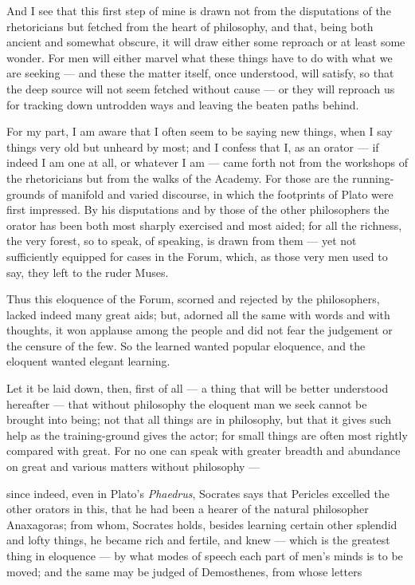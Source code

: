  And I see that this first step of mine is drawn not from the disputations of the rhetoricians but fetched from the heart of philosophy, and that, being both ancient and somewhat obscure, it will draw either some reproach or at least some wonder. For men will either marvel what these things have to do with what we are seeking — and these the matter itself, once understood, will satisfy, so that the deep source will not seem fetched without cause — or they will reproach us for tracking down untrodden ways and leaving the beaten paths behind.

 For my part, I am aware that I often seem to be saying new things, when I say things very old but unheard by most; and I confess that I, as an orator — if indeed I am one at all, or whatever I am — came forth not from the workshops of the rhetoricians but from the walks of the Academy. For those are the running-grounds of manifold and varied discourse, in which the footprints of Plato were first impressed. By his disputations and by those of the other philosophers the orator has been both most sharply exercised and most aided; for all the richness, the very forest, so to speak, of speaking, is drawn from them — yet not sufficiently equipped for cases in the Forum, which, as those very men used to say, they left to the ruder Muses.

 Thus this eloquence of the Forum, scorned and rejected by the philosophers, lacked indeed many great aids; but, adorned all the same with words and with thoughts, it won applause among the people and did not fear the judgement or the censure of the few. So the learned wanted popular eloquence, and the eloquent wanted elegant learning.

 Let it be laid down, then, first of all — a thing that will be better understood hereafter — that without philosophy the eloquent man we seek cannot be brought into being; not that all things are in philosophy, but that it gives such help as the training-ground gives the actor; for small things are often most rightly compared with great. For no one can speak with greater breadth and abundance on great and various matters without philosophy —

 since indeed, even in Plato's \textit{Phaedrus}, Socrates says that Pericles excelled the other orators in this, that he had been a hearer of the natural philosopher Anaxagoras; from whom, Socrates holds, besides learning certain other splendid and lofty things, he became rich and fertile, and knew — which is the greatest thing in eloquence — by what modes of speech each part of men's minds is to be moved; and the same may be judged of Demosthenes, from whose letters

